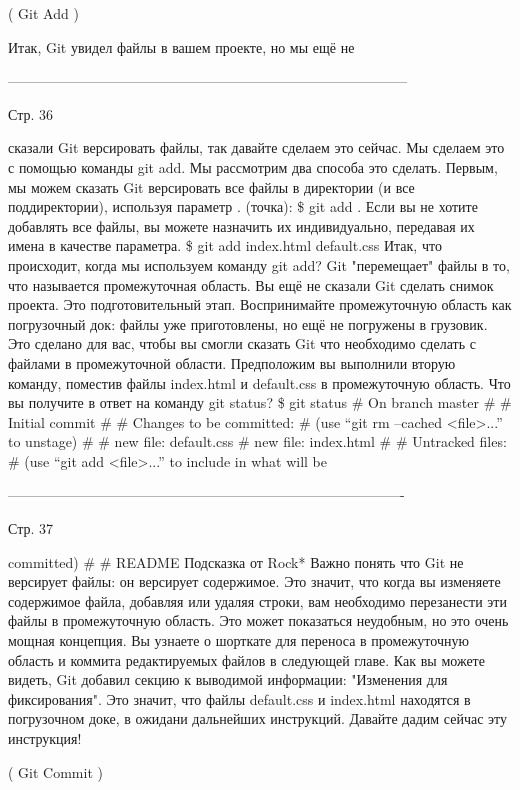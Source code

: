 ( Git Add )

Итак, Git увидел файлы в вашем проекте, но мы ещё не

--------------------------------------------------------------------------------------

Стр. 36

сказали Git версировать файлы, так давайте сделаем это сейчас. Мы сделаем это с помощью
команды git add.
Мы рассмотрим два способа это сделать. Первым, мы можем сказать Git версировать все 
файлы в директории (и все поддиректории), используя параметр . (точка):
\$ git add .
Если вы не хотите добавлять все файлы, вы можете назначить их индивидуально, передавая
их имена в качестве параметра.
\$ git add index.html default.css
Итак, что происходит, когда мы используем команду git add? Git "перемещает" файлы в то,
что называется промежуточная область. Вы ещё не сказали Git сделать снимок проекта. Это
подготовительный этап. Воспринимайте промежуточную область как погрузочный док: файлы уже
приготовлены, но ещё не погружены в грузовик. Это сделано для вас, чтобы вы смогли сказать
Git что необходимо сделать с файлами в промежуточной области. Предположим вы выполнили
вторую команду, поместив файлы index.html и default.css в промежуточную область. Что вы
получите в ответ на команду git status?
\$ git status
# On branch master
#
# Initial commit
#
# Changes to be committed:
#
(use “git rm --cached <file>...” to unstage)
#
#    new file: default.css
#    new file: index.html
#
# Untracked files:
#
(use “git add <file>...” to include in what will be

-------------------------------------------------------------------------------------

Стр. 37

committed)
#
#   
README
        Подсказка от Rock*
        Важно понять что Git не версирует файлы: он версирует содержимое. Это значит,
        что когда вы изменяете содержимое файла, добавляя или удаляя строки, вам 
        необходимо перезанести эти файлы в промежуточную область. Это может показаться
        неудобным, но это очень мощная концепция. Вы узнаете о шорткате для переноса в 
        промежуточную область и коммита редактируемых файлов в следующей главе.
Как вы можете видеть, Git добавил секцию к выводимой информации: "Изменения для 
фиксирования". Это значит, что файлы default.css и index.html находятся в погрузочном
доке, в ожидани дальнейших инструкций. Давайте дадим сейчас эту инструкция!

( Git Commit )

